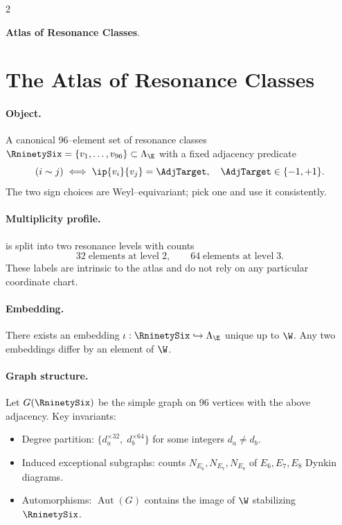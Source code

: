 \documentclass[12pt]{article}
\begin{document}
\newpage
\begin{multicols}{2}
\begin{singlespace}
\tableofcontents
\end{singlespace}
\end{multicols}

\thispagestyle{empty}
\newpage

\textbf{Atlas of Resonance Classes}.


\section{The Atlas of Resonance Classes}

\paragraph{Object.} A canonical 96–element set of resonance classes \(\RninetySix=\{v_1,\dots,v_{96}\}\subset \Lambda_{\E}\) with a fixed adjacency predicate
\[
(i\sim j) \iff \ip{v_i}{v_j} = \AdjTarget, \quad \AdjTarget\in\{-1,+1\}.
\]
The two sign choices are Weyl–equivariant; pick one and use it consistently.


\paragraph{Multiplicity profile.} \RninetySix is split into two resonance levels with counts
\[
32 \;\text{elements at level}\; 2,\qquad 64 \;\text{elements at level}\; 3.
\]
These labels are intrinsic to the atlas and do not rely on any particular coordinate chart.


\paragraph{Embedding.} There exists an embedding \(\iota: \RninetySix\hookrightarrow \Lambda_{\E}\) unique up to \(\W\). Any two embeddings differ by an element of \(\W\).


\paragraph{Graph structure.} Let \(G(\RninetySix)\) be the simple graph on 96 vertices with the above adjacency. Key invariants:
\begin{itemize}[nosep]
\item Degree partition: \(\{d_a^{\times 32},\; d_b^{\times 64}\}\) for some integers \(d_a\neq d_b\).
\item Induced exceptional subgraphs: counts \(N_{E_6}, N_{E_7}, N_{E_8}\) of \(E_6,E_7,E_8\) Dynkin diagrams.
\item Automorphisms: \(\operatorname{Aut}(G)\) contains the image of \(\W\) stabilizing \(\RninetySix\).
\end{itemize}
\end{document}
